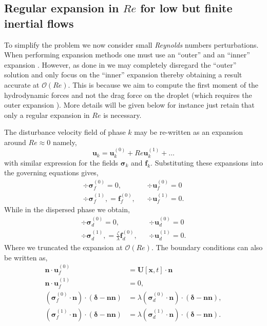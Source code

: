 \subsection{Regular expansion in $Re$ for low but finite inertial flows}

To simplify the problem we now consider small \textit{Reynolds} numbers perturbations. 
When performing expansion methods one must use an ``outer'' and an ``inner'' expansion \citet{proudman1957expansions}. 
However, as done in \citet{stone2001inertial,raja2010inertial,jiang2021inertial} we may completely disregard the ``outer'' solution and only focus on the ``inner'' expansion thereby obtaining a result accurate at $\mathcal{O}(Re)$. 
This is because we aim to compute the first moment of the hydrodynamic forces and not the drag force on the droplet (which requires the outer expansion \citep{proudman1957expansions}). 
More details will be given below for instance just retain that only a regular expansion in $Re$ is necessary.

The disturbance velocity field of phase $k$ may be re-written as an expansion around $Re \approx 0$ namely, 
\begin{equation*}
    \textbf{u}_k = \textbf{u}_k^{(0)} + Re \textbf{u}_k^{(1)} + \ldots
\end{equation*}
with similar expression for the fields $\bm\sigma_k$ and $\textbf{f}_k$. 
Substituting these expansions into the governing equations gives,
\begin{align}
    \div\bm\sigma_f^{(0)}
    = 0,
    && \div \textbf{u}_f^{(0)} = 0 
    \label{eq:zeroth_order_NS_f}
    \\
    \div\bm\sigma_f^{(1)},
    =  \textbf{f}_f^{(0)},
    && \div \textbf{u}_f^{(1)} = 0.  
    \label{eq:first_order_NS_f}
\end{align}
While in the dispersed phase we obtain, 
\begin{align}
    \div\bm\sigma_d^{(0)}
    = 0,
    && \div \textbf{u}_d^{(0)} = 0 
    \label{eq:zeroth_order_NS_d}
    \\
    \div\bm\sigma_d^{(1)},
    = \frac{\zeta}{\lambda} \textbf{f}_d^{(0)},
    && \div \textbf{u}_d^{(1)} = 0. 
    \label{eq:first_order_NS_f}
\end{align}
Where we truncated the expansion at $\mathcal{O}(Re)$.  
The boundary conditions can also be written as, 
\begin{align}
    \textbf{n}\cdot\textbf{u}_f^{(0)}
    &= \textbf{U}[\textbf{x},t]\cdot \textbf{n} \\
    \textbf{n}\cdot\textbf{u}_f^{(1)}
    \label{eq:bc_inertia_U}
    &= 0, \\
    \label{eq:bc_non_inertia}
    (\bm\sigma_f^{(0)}\cdot\textbf{n})\cdot (\bm\delta - \textbf{nn})
    &= \lambda (\bm\sigma_d^{(0)}\cdot \textbf{n})\cdot (\bm\delta - \textbf{nn}),\\
    (\bm\sigma_f^{(1)}\cdot\textbf{n})\cdot (\bm\delta - \textbf{nn})
    &= \lambda (\bm\sigma_d^{(1)}\cdot \textbf{n})\cdot (\bm\delta - \textbf{nn}). 
    \label{eq:bc_inertial}
\end{align}


